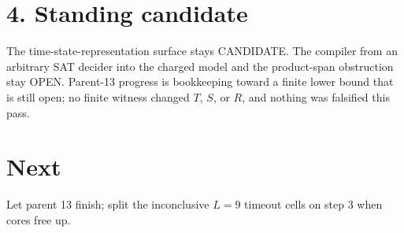 \documentclass[11pt]{article}
\begin{document}
\section*{4. Standing candidate}
The time-state-representation surface stays CANDIDATE. The compiler from an arbitrary SAT decider into the charged model and the product-span obstruction stay OPEN. Parent-13 progress is bookkeeping toward a finite lower bound that is still open; no finite witness changed $T$, $S$, or $R$, and nothing was falsified this pass.

\section*{Next}
Let parent 13 finish; split the inconclusive $L=9$ timeout cells on step 3 when cores free up.
\end{document}
